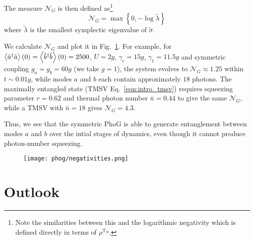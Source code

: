 \noindent The measure $\mathcal{N}_G$ is then defined as\footnote{Note the similarities between this and the logarithmic negativity \cite{Plenio2005} which is defined directly in terms of $\rho^{\text{T}_B}$.}
\begin{equation}
\mathcal{N}_G = \max\left\{0, - \log \tilde{\lambda} \right\}
\end{equation}
where $\tilde{\lambda}$ is the smallest symplectic eigenvalue of $\tilde{\sigma}$. %

We calculate $\mathcal{N}_G$ and plot it in Fig.~\ref{fig:phog_negativities}. For example, for $\ev{\hat{a}^\dagger \hat{a}}\left(0\right) = \ev{\hat{b}^\dagger \hat{b}}\left(0\right) = 2500$, $U = 2 g$, $\gamma_c = 15 g$, $\gamma_1 = 11.5 g$ and symmetric coupling $g_a = g_b = 60 g$ (we take $g=1$), the system evolves to $\mathcal{N}_G \approx 1.25$ within $t \sim 0.01 g$, while modes $a$ and $b$ each contain approximately $18$ photons. The maximally entangled state (TMSV Eq.~\ref{eqn:intro_tmsv}) requires squeezing parameter $r = 0.62$ and thermal photon number $\bar{n} = 0.44$ to give the same $\mathcal{N}_G$, while a TMSV with $\bar{n}=18$ gives $\mathcal{N}_G = 4.3$.

 Thus, we see that the symmetric PhoG is able to generate entanglement between modes $a$ and $b$ over the intial stages of dynamics, even though it cannot produce photon-number squeezing. 


\begin{figure}[htp]
\centering
\texttt{[image: phog/negativities.png]}
\caption{\label{fig:phog_negativities} }
\end{figure}



\section{Outlook}










